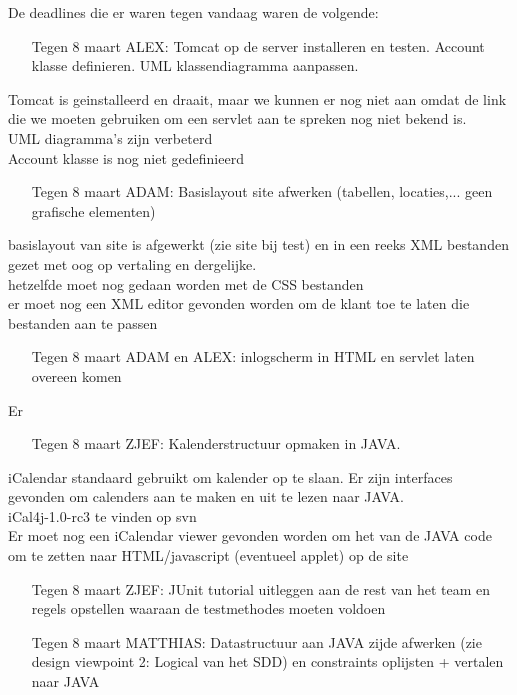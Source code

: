 \documentclass{article}
\begin{document}
De deadlines die er waren tegen vandaag waren de volgende: 
\begin{itemize}
	\item[Tegen 8 maart] ALEX: Tomcat op de server installeren en testen. Account klasse definieren. UML klassendiagramma aanpassen.
\end{itemize}
Tomcat is geinstalleerd en draait, maar we kunnen er nog niet aan omdat de link die we moeten gebruiken om een servlet aan te spreken nog niet bekend is. \\
UML diagramma's zijn verbeterd \\
Account klasse is nog niet gedefinieerd \\
\begin{itemize}
	\item[Tegen 8 maart] ADAM: Basislayout site afwerken (tabellen, locaties,... geen grafische elementen) 
\end{itemize}
basislayout van site is afgewerkt (zie site bij test) en in een reeks XML bestanden gezet met oog op vertaling en dergelijke. \\
hetzelfde moet nog gedaan worden met de CSS bestanden \\
er moet nog een XML editor gevonden worden om de klant toe te laten die bestanden aan te passen \\
\begin{itemize}
	\item[Tegen 8 maart] ADAM en ALEX: inlogscherm in HTML en servlet laten overeen komen 
\end{itemize}
Er 
\begin{itemize}
	\item[Tegen 8 maart] ZJEF: Kalenderstructuur opmaken in JAVA. 
\end{itemize}
iCalendar standaard gebruikt om kalender op te slaan. Er zijn interfaces gevonden om calenders aan te maken en uit te lezen naar JAVA. \\
iCal4j-1.0-rc3 te vinden op svn \\
Er moet nog een iCalendar viewer gevonden worden om het van de JAVA code om te zetten naar HTML/javascript (eventueel applet) op de site \\
\begin{itemize}
	\item[Tegen 8 maart] ZJEF: JUnit tutorial uitleggen aan de rest van het team en regels opstellen waaraan de testmethodes moeten voldoen 
	\item[Tegen 8 maart] MATTHIAS: Datastructuur aan JAVA zijde afwerken (zie design viewpoint 2: Logical van het SDD) en constraints oplijsten + vertalen naar JAVA 
\end{itemize}
\end{document}
